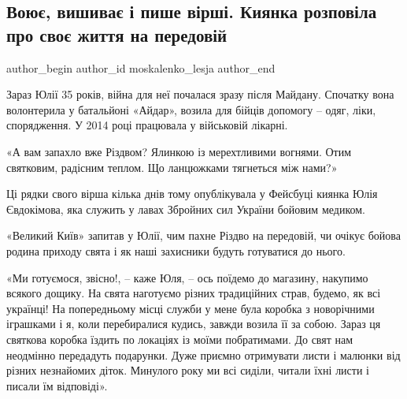  
 
 
 
 
\subsection{Воює, вишиває і пише вірші. Киянка розповіла про своє життя на передовій}
\label{sec:07_12_2021.stz.kiev.bigkyiv.1.kyanka_peredovaja_vojna}


\ifcmt
 author_begin
   author_id moskalenko_lesja
 author_end
\fi

Зараз Юлії 35 років, війна для неї почалася зразу після Майдану. Спочатку вона
волонтерила у батальйоні «Айдар», возила для бійців допомогу – одяг, ліки,
спорядження. У 2014 році працювала у військовій лікарні.


\begin{zzquote}
«А вам запахло вже Різдвом?
Ялинкою із мерехтливими вогнями.
Отим святковим, радісним теплом.
Що ланцюжками тягнеться між нами?»
\end{zzquote}

Ці рядки свого вірша кілька днів тому опублікувала у Фейсбуці киянка Юлія
Євдокімова, яка служить у лавах Збройних сил України бойовим медиком.

«Великий Київ» запитав у Юлії, чим пахне Різдво на передовій, чи очікує бойова
родина приходу свята і як наші захисники будуть готуватися до нього.

«Ми готуємося, звісно!, – каже Юля, – ось поїдемо до магазину, накупимо всякого
дощику. На свята наготуємо різних традиційних страв, будемо, як всі українці!
На попередньому місці служби у мене була коробка з новорічними іграшками і я,
коли перебиралися кудись, завжди возила її за собою. Зараз ця святкова коробка
їздить по локаціях із моїми побратимами. До свят нам неодмінно передадуть
подарунки. Дуже приємно отримувати листи і малюнки від різних незнайомих діток.
Минулого року ми всі сиділи, читали їхні листи і писали їм відповіді».

